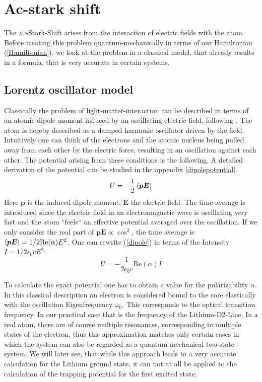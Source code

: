 \newpage
\newpage
\section{Ac-stark shift}
The \textsc{ac}-Stark-Shift arises from the interaction of electric fields with the atom. Before treating this problem quantum-mechanically in terms of our Hamiltonian (\ref{Hamiltonian}), we look at the problem in a classical model, that already results in a formula, that is very accurate in certain systems. 
\subsection{Lorentz oscillator model}

 Classically the problem of light-matter-interaction can be described in terms of an atomic dipole moment induced by an oscillating electric field, following \cite{dipole}. The atom is hereby described as a damped harmonic oscillator driven by the field. Intuitively one can think of the electrons and the atomic nucleus being pulled away from each other by the electric force, resulting in an oscillation against each other. The potential arising from these conditions is the following. A detailed derivation of the potential can be studied in the appendix \ref{dipolepotential}.
\begin{equation}
U=-\frac{1}{2}\left\langle \boldsymbol{p E}\right\rangle
\label{dipole}
\end{equation} 
Here $\boldsymbol{p}$ is the induced dipole moment, $\boldsymbol{E}$ the electric field. The time-average is introduced since the electric field in an electromagnetic wave is oscillating very fast and the atom “feels“ an effective potential averaged over the oscillation. If we only consider the real part of $\boldsymbol{p}\boldsymbol{E}\propto \cos^2$, the time average is $\left\langle \boldsymbol{p}\boldsymbol{E}\right\rangle=1/2 \mathrm{ Re}(\alpha)E^2$. One can rewrite (\ref{dipole}) in terms of the Intensity $I=1/2\epsilon_0cE^2 $:
\begin{equation}
U=-\frac{1}{2\epsilon_0 c}\mathrm{Re}(\alpha)I
\end{equation} 

To calculate the exact potential one has to obtain a value for the polarizability $\alpha$. In this classical description an electron is considered bound to the core elastically with the oscillation Eigenfrequency $\omega_0$. This corresponds to the optical transition frequency. In our practical case that is the frequency of the Lithium-D2-Line. In a real atom, there are of course multiple resonances, corresponding to multiple states of the electron, thus this approximation matches only  certain cases in which the system can also be regarded as a quantum mechanical two-state-system. We will later see, that while this approach leads to a very accurate calculation for the Lithium ground state, it can not at all be applied to the calculation of the trapping potential for the first excited state.

